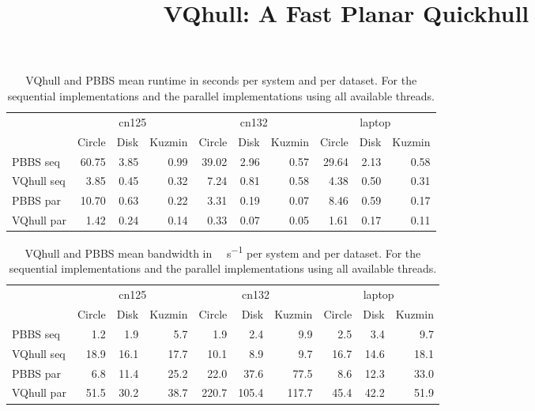\documentclass{cas-sc}
\begin{document}
\title[mode=title]{VQhull: A Fast Planar Quickhull}

\appendix

\begin{table}
  \centering
  \begin{tabular}{lrrrrrrrrr}
    & \multicolumn{3}{c}{cn125} & \multicolumn{3}{c}{cn132} & \multicolumn{3}{c}{laptop} \\
    & Circle & Disk & Kuzmin & Circle & Disk & Kuzmin & Circle & Disk & Kuzmin \\\midrule
    PBBS seq & 60.75 & 3.85 & 0.99 & 39.02 & 2.96 & 0.57 & 29.64 & 2.13 & 0.58 \\
    VQhull seq & 3.85 & 0.45 & 0.32 & 7.24 & 0.81 & 0.58 & 4.38 & 0.50 & 0.31 \\
    PBBS par & 10.70 & 0.63 & 0.22 & 3.31 & 0.19 & 0.07 & 8.46 & 0.59 & 0.17 \\
    VQhull par & 1.42 & 0.24 & 0.14 & 0.33 & 0.07 & 0.05 & 1.61 & 0.17 & 0.11 \\
  \end{tabular}
  \caption{VQhull and PBBS mean runtime in seconds per system and per dataset.
  For the sequential implementations and the parallel implementations using all
  available threads.}
\end{table}

\begin{table}
  \centering
  \begin{tabular}{lrrrrrrrrr}
    & \multicolumn{3}{c}{cn125} & \multicolumn{3}{c}{cn132} & \multicolumn{3}{c}{laptop} \\
    & Circle & Disk & Kuzmin & Circle & Disk & Kuzmin & Circle & Disk & Kuzmin \\\midrule
    PBBS seq & 1.2 & 1.9 & 5.7 & 1.9 & 2.4 & 9.9 & 2.5 & 3.4 & 9.7 \\
    VQhull seq & 18.9 & 16.1 & 17.7 & 10.1 & 8.9 & 9.7 & 16.7 & 14.6 & 18.1 \\
    PBBS par & 6.8 & 11.4 & 25.2 & 22.0 & 37.6 & 77.5 & 8.6 & 12.3 & 33.0 \\
    VQhull par & 51.5 & 30.2 & 38.7 & 220.7 & 105.4 & 117.7 & 45.4 & 42.2 & 51.9 \\
  \end{tabular}
  \caption{VQhull and PBBS mean bandwidth in \si{\giga\byte\per\second} per
  system and per dataset. For the sequential implementations and the parallel
  implementations using all available threads.}
\end{table}
\end{document}
